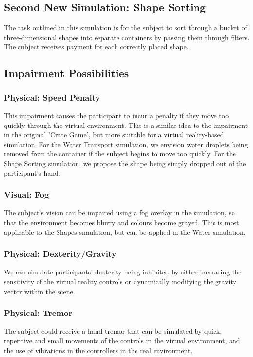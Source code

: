 \documentclass{article}
\begin{document}
\subsection*{Second New Simulation: Shape Sorting}

The task outlined in this simulation is for the subject to sort through a bucket of three-dimensional shapes into separate containers by passing them through filters. The subject receives payment for each correctly placed shape.

\subsection*{Impairment Possibilities}

\subsubsection*{Physical: Speed Penalty}
This impairment causes the participant to incur a penalty if they move too quickly through the virtual environment. This is a similar idea to the impairment in the original 'Crate Game', but more suitable for a virtual reality-based simulation. For the Water Transport simulation, we envision water droplets being removed from the container if the subject begins to move too quickly. For the Shape Sorting simulation, we propose the shape being simply dropped out of the participant's hand.

\subsubsection*{Visual: Fog}
The subject's vision can be impaired using a fog overlay in the simulation, so that the environment becomes blurry and colours become grayed. This is most applicable to the Shapes simulation, but can be applied in the Water simulation.

\subsubsection*{Physical: Dexterity/Gravity}
We can simulate participants' dexterity being inhibited by either increasing the sensitivity of the virtual reality controls or dynamically modifying the gravity vector within the scene. 

\subsubsection*{Physical: Tremor}
The subject could receive a hand tremor that can be simulated by quick, repetitive and small movements of the controls in the virtual environment, and the use of vibrations in the controllers in the real environment.
\end{document}
